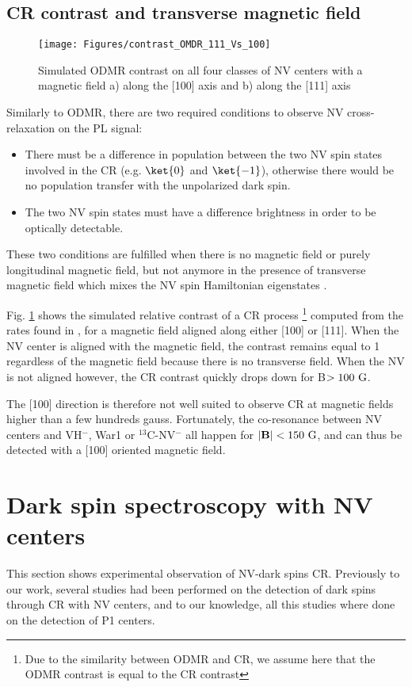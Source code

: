 \documentclass[a4paper,11pt]{report}
\begin{document}
\subsection{CR contrast and transverse magnetic field}
\label{CR contrast}

\begin{figure}[h]
\centering
\texttt{[image: Figures/contrast\_OMDR\_111\_Vs\_100]}
\caption{Simulated ODMR contrast on all four classes of NV centers with a magnetic field a) along the [100] axis and b) along the [111] axis}
\label{121 vs 22 contrast}
\end{figure}

Similarly to ODMR, there are two required conditions to observe NV cross-relaxation on the PL signal: 
\begin{itemize}
\item There must be a difference in population between the two NV spin states involved in the CR (e.g. $\ket{0}$ and $\ket{-1}$), otherwise there would be no population transfer with the unpolarized dark spin.
\item The two NV spin states must have a difference brightness in order to be optically detectable.
\end{itemize}

These two conditions are fulfilled when there is no magnetic field or purely longitudinal magnetic field, but not anymore in the presence of transverse magnetic field which mixes the NV spin Hamiltonian eigenstates \citep{tetienne2012magnetic}.

Fig. \ref{121 vs 22 contrast} shows the simulated relative contrast of a CR process \footnote{Due to the similarity between ODMR and CR, we assume here that the ODMR contrast is equal to the CR contrast} computed from the rates found in \citep{tetienne2012magnetic}, for a magnetic field aligned along either [100] or [111]. When the NV center is aligned with the magnetic field, the contrast remains equal to 1 regardless of the magnetic field because there is no transverse field. When the NV is not aligned however, the CR contrast quickly drops down for B$>100\ \rm G$.

The [100] direction is therefore not well suited to observe CR at magnetic fields higher than a few hundreds gauss. Fortunately, the co-resonance between NV centers and VH$^-$, War1 or $^{13}$C-NV$^-$ all happen for $|\mathbf{B}| < 150 \ \rm G$, and can thus be detected with a [100] oriented magnetic field. 

\section{Dark spin spectroscopy with NV centers}
This section shows experimental observation of NV-dark spins CR. Previously to our work, several studies \citep{van1989cross, holliday1989optical, epstein2005anisotropic, armstrong2010nv,   hall2016detection, wickenbrock2016microwave,  wood2016wide,  alfasi2019detection, lazda2021cross} had been performed on the detection of dark spins through CR with NV centers, and to our knowledge, all this studies where done on the detection of P1 centers. 
\end{document}

